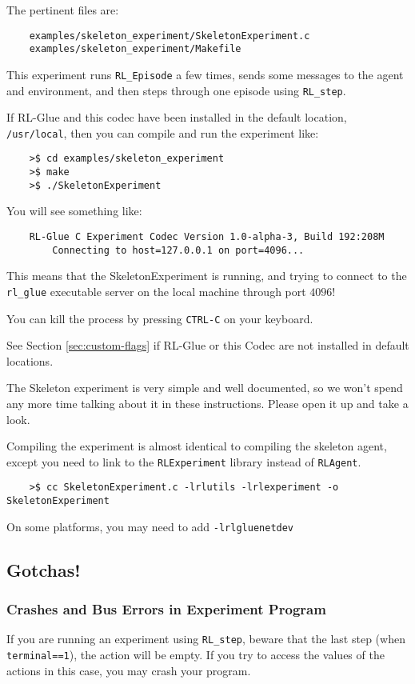 \documentclass[11pt]{article}
\begin{document}
The pertinent files are:
\begin{verbatim}
	examples/skeleton_experiment/SkeletonExperiment.c
	examples/skeleton_experiment/Makefile
\end{verbatim}

This experiment runs \texttt{RL\_Episode} a few times, sends some messages to the agent and environment, and then steps through one episode using \texttt{RL\_step}.

If RL-Glue and this codec have been installed in the default location, \texttt{/usr/local}, then you can compile and run the experiment like:
\begin{verbatim}
	>$ cd examples/skeleton_experiment
	>$ make
	>$ ./SkeletonExperiment
\end{verbatim}

You will see something like:
\begin{verbatim}
	RL-Glue C Experiment Codec Version 1.0-alpha-3, Build 192:208M
		Connecting to host=127.0.0.1 on port=4096...
\end{verbatim}

This means that the SkeletonExperiment is running, and trying to connect to the \texttt{rl\_glue} executable server on the local machine through port $4096$!  

You can kill the process by pressing \texttt{CTRL-C} on your keyboard.

See Section \ref{sec:custom-flags} if RL-Glue or this Codec are not installed in default locations.

The Skeleton experiment is very simple and well documented, so we won't spend any more time talking about it in these instructions.
Please open it up and take a look.


Compiling the experiment is almost identical to compiling the skeleton agent, except you need to link to the \texttt{RLExperiment} library instead of \texttt{RLAgent}.
\begin{verbatim}
	>$ cc SkeletonExperiment.c -lrlutils -lrlexperiment -o SkeletonExperiment
\end{verbatim}

On some platforms, you may need to add \texttt{-lrlgluenetdev}


\subsection{Gotchas!}
\subsubsection{Crashes and Bus Errors in Experiment Program}
If you are running an experiment using \texttt{RL\_step}, beware that the last step (when \texttt{terminal==1}), the action will be empty.  If you try to access the values of the actions in this 
case, you may crash your program.
\end{document}
